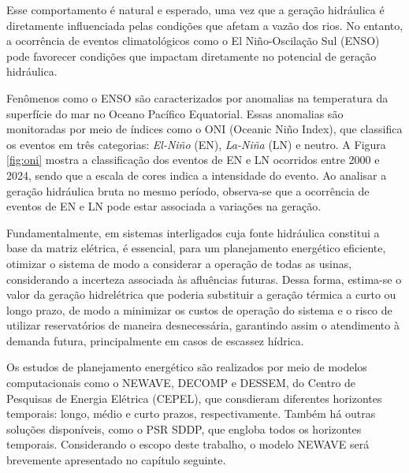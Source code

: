\begin{figure}[!ht]
	{}
	{}
\end{figure}

Esse comportamento é natural e esperado, uma vez que a geração hidráulica é diretamente influenciada pelas condições
que afetam a vazão dos rios. No entanto, a ocorrência de eventos climatológicos como o El Niño-Oscilação Sul (ENSO) pode
favorecer condições que impactam diretamente no potencial de geração hidráulica. \cite{de2012influencia}

Fenômenos como o ENSO são caracterizados por anomalias na temperatura da superfície do mar no Oceano Pacífico
Equatorial. Essas anomalias são monitoradas por meio de índices como o ONI (Oceanic Niño Index), que classifica os 
eventos em três categorias: \textit{El-Niño} (EN), \textit{La-Niña} (LN) e neutro. A Figura \ref{fig:oni} mostra a 
classificação dos eventos de EN e LN ocorridos entre 2000 e 2024, sendo que a escala de cores indica a intensidade do 
evento. Ao analisar a geração hidráulica bruta no mesmo período, observa-se que a ocorrência de eventos de EN e LN 
pode estar associada a variações na geração.

\begin{figure}[!ht]
	{}
	{}
\end{figure}

Fundamentalmente, em sistemas interligados cuja fonte hidráulica constitui a base da matriz elétrica, é essencial, 
para um planejamento energético eficiente, otimizar o sistema de modo a considerar a operação de todas as usinas, 
considerando a incerteza associada às afluências futuras. Dessa forma, estima-se o valor da geração hidrelétrica que 
poderia substituir a geração térmica a curto ou longo prazo, de modo a minimizar os custos de operação do sistema e o 
risco de utilizar reservatórios de maneira desnecessária, garantindo assim o atendimento à demanda futura, 
principalmente em casos de escassez hídrica.

Os estudos de planejamento energético são realizados por meio de modelos computacionais como o NEWAVE, DECOMP e DESSEM, 
do Centro de Pesquisas de Energia Elétrica (CEPEL), que consdieram diferentes horizontes temporais: longo, médio e curto prazos, respectivamente. 
Também há outras soluções disponíveis, como o PSR SDDP, que engloba todos os horizontes temporais. Considerando o escopo deste trabalho, o modelo 
NEWAVE será brevemente apresentado no capítulo seguinte.

